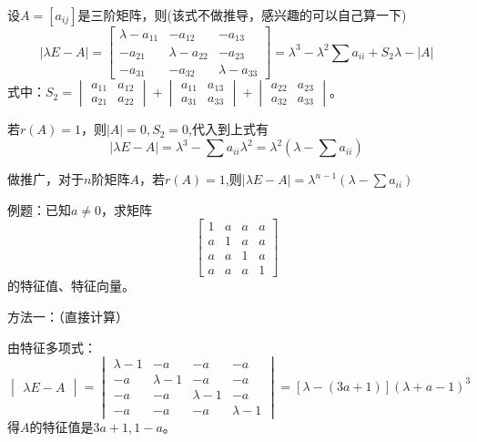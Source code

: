\documentclass[a4paper]{report}
\begin{document}
\begin{tips}
设$A=[a_{ij}]$是三阶矩阵，则(该式不做推导，感兴趣的可以自己算一下)
\begin{equation*}|\lambda E-A|=
  \begin{bmatrix}
    \lambda-a_{11} & -a_{12} &-a_{13} \\
-a_{21} & \lambda-a_{22} &-a_{23} \\
-a_{31} & -a_{32} &\lambda-a_{33}
  \end{bmatrix}=\lambda^{3}-\lambda^2\sum a_{ii}+S_{2}\lambda-|A|
\end{equation*}
式中：$S_{2}=
\begin{vmatrix}
  a_{11} & a_{12} \\
  a_{21} & a_{22}
\end{vmatrix}+\begin{vmatrix}
  a_{11} & a_{13} \\
  a_{31} & a_{33}
\end{vmatrix}+\begin{vmatrix}
  a_{22} & a_{23} \\
  a_{32} & a_{33}
\end{vmatrix}
$。

若$r(A)=1$，则$|A|=0,S_{2}=0$,代入到上式有
\begin{equation*}
|\lambda E-A|=\lambda^{3}-\sum a_{ii}\lambda^2=\lambda^2\left(\lambda-\sum a_{ii}\right)
\end{equation*}

做推广，对于$n$阶矩阵$A$，若$r(A)=1$,则$|\lambda E-A|=\lambda^{n-1}\left(\lambda-\sum a_{ii}\right)$

例题：已知$a\neq 0$，求矩阵
\begin{equation*}
  \begin{bmatrix}
    1 & a & a& a\\
    a & 1& a& a\\
    a& a& 1& a\\
    a& a& a& 1
  \end{bmatrix}
\end{equation*}
的特征值、特征向量。

\begin{jie}
方法一：（直接计算）

由特征多项式：
\begin{equation*}
  \begin{vmatrix}
\lambda E-A
  \end{vmatrix}
  =\begin{vmatrix}
     \lambda-1 & -a& -a& -a \\
     -a& \lambda-1& -a& -a\\
     -a& -a& \lambda-1& -a\\
     -a& -a& -a& \lambda-1
   \end{vmatrix}=\left[\lambda-(3a+1)\right]\left(\lambda+a-1\right)^{3}
\end{equation*}
得$A$的特征值是$3a+1,1-a$。


\end{jie}
\end{tips}
\end{document}

